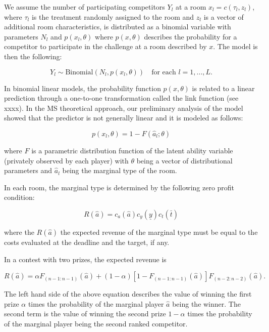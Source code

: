\documentclass[]{article}
\theoremstyle{plain} %
\newcommand\deadline{\bar{t}}
\newcommand\target{\underline{y}}
\newcommand\ctime{c_{t}}
\newcommand\cscore{c_{y}}
\newcommand\cability{c_{a}}
\newcommand\mtype{\hat{a}}
\begin{document}
We assume the number of participating competitors \(Y_l\) at a room
\(x_l = c(\tau_l, z_l)\), where \(\tau_l\) is the treatment randomly
assigned to the room and \(z_l\) is a vector of additional room
characteristics, is distributed as a binomial variable with parameters
\(N_l\) and \(p(x_l, \theta)\) where \(p(x, \theta)\) describes the
probability for a competitor to participate in the challenge at a room
described by \(x\). The model is then the following:

\begin{equation}
    \label{model}
    Y_{l} \sim \text{Binomial}(N_l, p(x_l, \theta)) \quad \text{for each } l=1,...,L.
\end{equation}

In binomial linear models, the probability function \(p(x, \theta)\) is
related to a linear prediction through a one-to-one transformation
called the link function (see xxxx). In the MS theoretical approach, our
preliminary analysis of the model showed that the predictor is not
generally linear and it is modeled as follows:

\begin{equation}
    \label{probability}
    p(x_l, \theta) = 1 - F(\mtype_l; \theta)
\end{equation}

where \(F\) is a parametric distribution function of the latent ability
variable (privately observed by each player) with \(\theta\) being a
vector of distributional parameters and \(\mtype_l\) being the marginal
type of the room.

In each room, the marginal type is determined by the following zero
profit condition:

\begin{equation}
    \label{zero profit}
    R(\mtype) = \cability(\mtype)\cscore(\target)\ctime(\deadline)
\end{equation}

where the \(R(\mtype)\) the expected revenue of the marginal type must
be equal to the costs evaluated at the deadline and the target, if any.

In a contest with two prizes, the expected revenue is

\begin{equation}
    R(\mtype) = 
        \alpha F_{(n-1:n-1)}(\mtype) 
        + (1-\alpha) [1-F_{(n-1:n-1)}(\mtype)]F_{(n-2:n-2)}(\mtype).
\end{equation}

The left hand side of the above equation describes the value of winning
the first prize \(\alpha\) times the probability of the marginal player
\(\mtype\) being the winner. The second term is the value of winning the
second prize \(1-\alpha\) times the probability of the marginal player
being the second ranked competitor.
\end{document}
